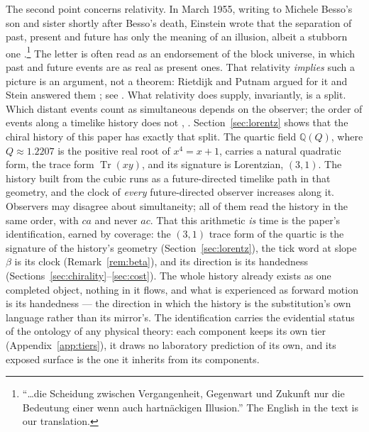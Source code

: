 \documentclass[11pt]{amsart}
\theoremstyle{plain}
\theoremstyle{definition}
\theoremstyle{remark}
\begin{document}
The second point concerns relativity. In March 1955, writing to Michele Besso's son and sister shortly after Besso's death, Einstein wrote that the separation of past, present and future has only the meaning of an illusion, albeit a stubborn one \cite{einstein1955}.\footnote{``\dots die Scheidung zwischen Vergangenheit, Gegenwart und Zukunft nur die Bedeutung einer wenn auch hartn\"ackigen Illusion.'' The English in the text is our translation.} The letter is often read as an endorsement of the block universe, in which past and future events are as real as present ones. That relativity \emph{implies} such a picture is an argument, not a theorem: Rietdijk and Putnam argued for it \cite{rietdijk1966,putnam1967} and Stein answered them \cite{stein1968}; see \cite{savitt2021}. What relativity does supply, invariantly, is a split. Which distant events count as simultaneous depends on the observer; the order of events along a timelike history does not \cite{zeeman1964}, \cite[Ch.~6]{hawkingellis1973}. Section~\ref{sec:lorentz} shows that the chiral history of this paper has exactly that split. The quartic field $\mathbb{Q}(Q)$, where $Q \approx 1.2207$ is the positive real root of $x^4 = x + 1$, carries a natural quadratic form, the trace form $\operatorname{Tr}(xy)$, and its signature is Lorentzian, $(3,1)$. The history built from the cubic runs as a future-directed timelike path in that geometry, and the clock of \emph{every} future-directed observer increases along it. Observers may disagree about simultaneity; all of them read the history in the same order, with $ca$ and never $ac$.  That this arithmetic \emph{is} time is the paper's identification, earned by coverage: the $(3,1)$ trace form of the quartic is the signature of the history's geometry (Section~\ref{sec:lorentz}), the tick word at slope $\beta$ is its clock (Remark~\ref{rem:beta}), and its direction is its handedness (Sections~\ref{sec:chirality}--\ref{sec:cost}). The whole history already exists as one completed object, nothing in it flows, and what is experienced as forward motion is its handedness --- the direction in which the history is the substitution's own language rather than its mirror's. The identification carries the evidential status of the ontology of any physical theory: each component keeps its own tier (Appendix~\ref{app:tiers}), it draws no laboratory prediction of its own, and its exposed surface is the one it inherits from its components.
\end{document}
